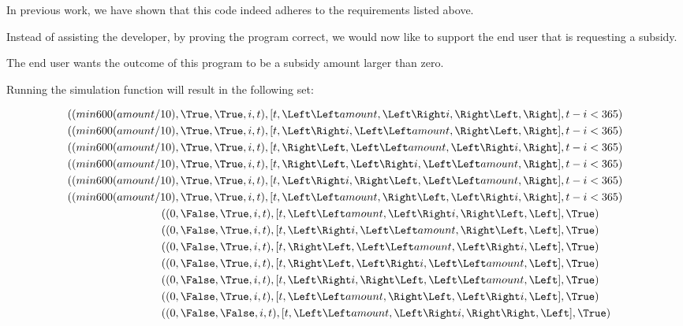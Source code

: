 In previous work, we have shown that this code indeed adheres to the requirements listed above.

Instead of assisting the developer, by proving the program correct, we would now like to support the end user that is requesting a subsidy.

The end user wants the outcome of this program to be a subsidy amount larger than zero.

Running the simulation function will result in the following set:

\begin{align*}
  ((min 600 (amount/10)&,  \True, \True, i, t),[t,\Left \Left amount,     \Left \Right i, \Right \Left, \Right],t-i<365)\\
  ((min 600 (amount/10)&,  \True, \True, i, t),[t,    \Left \Right i, \Left \Left amount, \Right \Left, \Right],t-i<365)\\
  ((min 600 (amount/10)&,  \True, \True, i, t),[t,      \Right \Left, \Left \Left amount, \Left \Right i, \Right],t-i<365)\\
  ((min 600 (amount/10)&,  \True, \True, i, t),[t,      \Right \Left, \Left \Right i, \Left \Left amount, \Right],t-i<365)\\
  ((min 600 (amount/10)&,  \True, \True, i, t),[t,    \Left \Right i, \Right \Left, \Left \Left amount, \Right],t-i<365)\\
  ((min 600 (amount/10)&,  \True, \True, i, t),[t,\Left \Left amount, \Right \Left, \Left \Right i, \Right],t-i<365)\\
  ((                  0&, \False, \True, i, t),[t,\Left \Left amount, \Left \Right i, \Right \Left, \Left],\True)\\
  ((                  0&, \False, \True, i, t),[t,    \Left \Right i, \Left \Left amount, \Right \Left, \Left],\True)\\
  ((                  0&, \False, \True, i, t),[t,      \Right \Left, \Left \Left amount, \Left \Right i, \Left],\True)\\
  ((                  0&, \False, \True, i, t),[t,      \Right \Left, \Left \Right i, \Left \Left amount, \Left],\True)\\
  ((                  0&, \False, \True, i, t),[t,    \Left \Right i, \Right \Left, \Left \Left amount, \Left],\True)\\
  ((                  0&, \False, \True, i, t),[t,\Left \Left amount, \Right \Left, \Left \Right i, \Left],\True)\\
  ((                  0&, \False,\False, i, t),[t,\Left \Left amount, \Left \Right i, \Right \Right, \Left],\True)\\

\end{align*}
